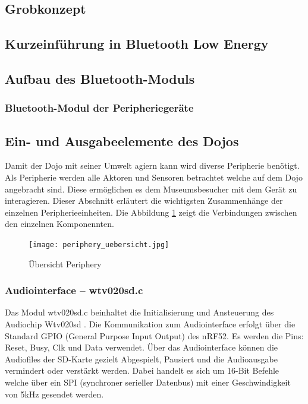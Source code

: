 \subsection{Grobkonzept}

\subsection{Kurzeinführung in Bluetooth Low Energy}

\subsection{Aufbau des Bluetooth-Moduls}

\subsubsection{Bluetooth-Modul der Peripheriegeräte}

\subsection{Ein- und Ausgabeelemente des Dojos}

Damit der Dojo mit seiner Umwelt agiern kann wird diverse Peripherie benötigt. Als Peripherie werden alle Aktoren und Sensoren betrachtet welche auf dem Dojo angebracht sind. Diese ermöglichen es dem Museumsbesucher mit dem Gerät zu interagieren. Dieser Abschnitt erläutert die wichtigsten Zusammenhänge der einzelnen Peripherieeinheiten. Die Abbildung \ref{fig:p_uebersicht} zeigt die Verbindungen zwischen den einzelnen Komponennten.

\begin{figure}[htb]
\begin{center}
\texttt{[image: periphery\_uebersicht.jpg]}
\caption{Übersicht Periphery} %
\label{fig:p_uebersicht}
\end{center}
\end{figure}

\subsubsection{Audiointerface -- wtv020sd.c}
Das Modul wtv020sd.c beinhaltet die Initialisierung und Ansteuerung des Audiochip Wtv020sd \cite{WTV020}. Die Kommunikation zum Audiointerface erfolgt über die Standard GPIO (General Purpose Input Output) des nRF52. Es werden die Pins: Reset, Busy, Clk und Data verwendet. Über das Audiointerface können die Audiofiles der SD-Karte gezielt Abgespielt, Pausiert und die Audioausgabe vermindert oder verstärkt werden. Dabei handelt es sich um 16-Bit Befehle welche über ein SPI (synchroner serieller Datenbus) mit einer Geschwindigkeit von 5kHz gesendet werden.

